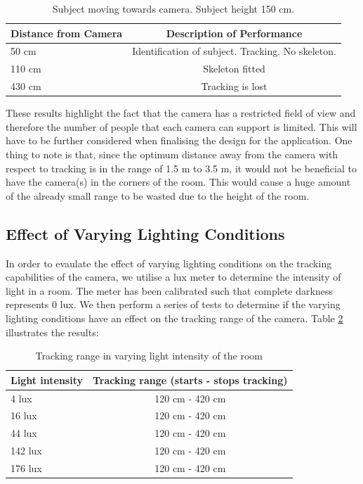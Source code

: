 \documentclass[11pt,a4paper]{article}
\begin{document}
\begin{table}[H]
\center
\begin{tabular}{ | l | c |}
\hline
Distance from Camera & Description of Performance \\
\hline
50 cm & Identification of subject. Tracking. No skeleton.\\
110 cm & Skeleton fitted\\
430 cm & Tracking is lost\\
\hline
\end{tabular}
\caption{Subject moving towards camera. Subject height 150 cm.}
\label{cam_range_150_toward}
\end{table}
\noindent
These results highlight the fact that the camera has a restricted field of view and therefore the number of people that each camera can support is limited. This will have to be further considered when finalising the design for the application. One thing to note is that, since  the optimum distance away from the camera with respect to tracking is in the range of 1.5 m to 3.5 m, it would not be beneficial to have the camera(s) in the corners of the room. This would cause a huge amount of the already small range to be wasted due to the height of the room. 

\subsection{Effect of Varying Lighting Conditions}
\noindent
In order to evaulate the effect of varying lighting conditions on the tracking capabilities of the camera, we utilise a lux meter to determine the intensity of light in a room. The meter has been calibrated such that complete darkness represents 0 lux. We then perform a series of tests to determine if the varying lighting conditions have an effect on the tracking range of the camera. Table \ref{cam_range_varying_light} illustrates the results:
\begin{table}[H]
\center
\begin{tabular}{ | l | c |}
\hline
Light intensity & Tracking range (starts - stops tracking) \\
\hline
4 lux & 120 cm - 420 cm\\
16 lux & 120 cm - 420 cm\\
44 lux & 120 cm - 420 cm\\
142 lux & 120 cm - 420 cm\\
176 lux & 120 cm - 420 cm\\
\hline
\end{tabular}
\caption{Tracking range in varying light intensity of the room}
\label{cam_range_varying_light}
\end{table}
\end{document}
